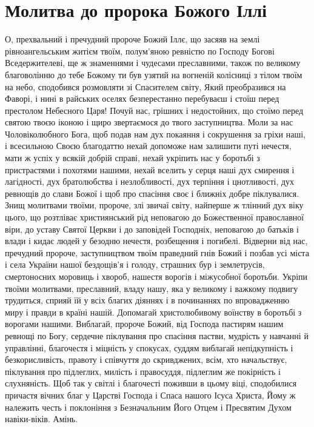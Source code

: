 \documentclass[chapters.tex]{subfiles}
\begin{document}
\section{Молитва до пророка Божого Іллі}
О, прехвальний і пречудний пророче Божий Іллє, що засяяв на землі рівноангельським житієм твоїм, полум’яною ревністю по Господу Богові Вседержителеві, ще ж знаменнями і чудесами преславними, також по великому благоволінню до тебе Божому ти був узятий на вогненій колісниці з тілом твоїм на небо, сподобився розмовляти зі Спасителем світу, Який преобразився на Фаворі, і нині в райських оселях безперестанно перебуваєш і стоїш перед престолом Небесного Царя! Почуй нас, грішних і недостойних, що стоїмо перед святою твоєю іконою і щиро звертаємося до твого заступництва. Моли за нас Чоловіколюбного Бога, щоб подав нам дух покаяння і сокрушення за гріхи наші, і всесильною Своєю благодаттю нехай допоможе нам залишити путі нечестя, мати ж успіх у всякій добрій справі, нехай укріпить нас у боротьбі з пристрастями і похотями нашими, нехай вселить у серця наші дух смирення і лагідності, дух братолюбства і незлобливості, дух терпіння і цнотливості, дух ревнощів до слави Божої і щоб про спасіння своє і ближніх добре піклувалися. Знищ молитвами твоїми, пророче, злі звичаї світу, найперше ж тлінний дух віку цього, що розтліває християнський рід неповагою до Божественної православної віри, до уставу Святої Церкви і до заповідей Господніх, неповагою до батьків і влади і кидає людей у безодню нечестя, розбещення і погибелі. Відверни від нас, пречудний пророче, заступництвом твоїм праведний гнів Божий і позбав усі міста і села України нашої бездощів’я і голоду, страшних бур і землетрусів, смертоносних моровиць і хвороб, нашестя ворогів і міжусобної боротьби. Укріпи твоїми молитвами, преславний, владу нашу, яка у великому і важкому подвигу трудиться, сприяй їй у всіх благих діяннях і в починаннях по впровадженню миру і правди в країні нашій. Допомагай христолюбивому воїнству в боротьбі з ворогами нашими. Виблагай, пророче Божий, від Господа пастирям нашим ревнощі по Богу, сердечне піклування про спасіння пастви, мудрість у навчанні й управлінні, благочестя і міцність у спокусах, суддям виблагай непідкупність і безкорисливість, правоту і співчуття до скривджених, всім, хто начальствує, піклування про підлеглих, милість і правосуддя, підлеглим же покірність і слухняність. Щоб так у світлі і благочесті поживши в цьому віці, сподобилися причастя вічних благ у Царстві Господа і Спаса нашого Ісуса Христа, Йому ж належить честь і поклоніння з Безначальним Його Отцем і Пресвятим Духом навіки-віків. Амінь.
\end{document}
